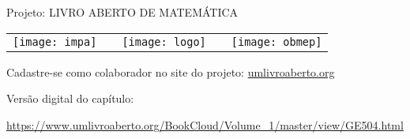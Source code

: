 
\renewcommand\chapterillustration{./abertura-estatistica1}%
\def\chapterwhat{}
\def\chapterbecause{} 

\mbox{}\thispagestyle{empty}\clearpage

\thispagestyle{empty}

\begin{center}
Projeto: LIVRO ABERTO DE MATEMÁTICA

\noindent \begin{tabular}{lcccr}
\texttt{[image: impa]}& \quad\quad& \texttt{[image: logo]} & \quad\quad& \texttt{[image: obmep]} 
\end{tabular}
\end{center}

\vspace*{.3cm}

Cadastre-se como colaborador no site do projeto: \url{umlivroaberto.org}

Versão digital do capítulo:

\url{https://www.umlivroaberto.org/BookCloud/Volume_1/master/view/GE504.html}


